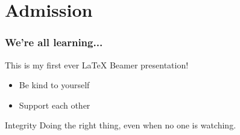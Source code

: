 \documentclass{beamer}
\begin{document}

\section{Admission}


\begin{frame}
    \frametitle{We're all learning...}

    This is my first ever \LaTeX{} Beamer presentation!

    \bigskip

    \begin{itemize}
        \item Be kind to yourself
        \item Support each other
    \end{itemize}

    \begin{block}{Integrity}
	Doing the right thing, even when no one is watching.
	\end{block}

\end{frame}
\end{document}

